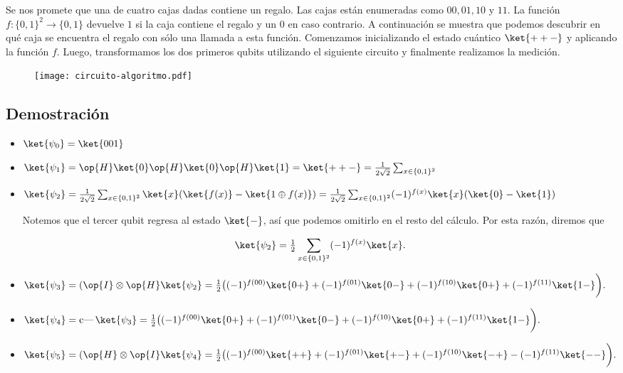 \documentclass[./../main.tex]{subfiles}
\begin{document}

Se nos promete que una de cuatro cajas dadas contiene un regalo. Las cajas están enumeradas como \(00, 01, 10\) y \(11\). La función \(f \colon \{0,1\}^2 \to \{0,1\}\) devuelve \(1\) si la caja contiene el regalo y un \(0\) en caso contrario.
A continuación se muestra que podemos descubrir en qué caja se encuentra el regalo con sólo una llamada a esta función. Comenzamos inicializando el estado cuántico \(\ket{++-}\) y aplicando la función \(f\). Luego, transformamos los dos primeros qubits utilizando el siguiente circuito y finalmente realizamos la medición.

\begin{figure}[htb]
	\centering
	\texttt{[image: circuito-algoritmo.pdf]}
\end{figure}

\subsection*{Demostración}

\begin{itemize}
	\item \(\ket{\psi_{0}} = \ket{001}\)
	\item \(\ket{\psi_{1}} = \op{H}\ket{0}\op{H}\ket{0}\op{H}\ket{1} = \ket{++-} = \tfrac{1}{2\sqrt{2}}\sum_{x\in \{0,1\}^{2}}\)
	\item \(\ket{\psi_{2}} = \tfrac{1}{2\sqrt{2}}\sum_{x\in \{0,1\}^{2}}\ket{x}(\ket{f(x)} -\ket{1 \oplus f(x)}) = \tfrac{1}{2\sqrt{2}}\sum_{x\in \{0,1\}^{2}}(-1)^{f(x)}\ket{x}(\ket{0} - \ket{1})\)

	      Notemos que el tercer qubit regresa al estado \(\ket{-}\), así que podemos omitirlo en el resto del cálculo. Por esta razón, diremos que

	      \begin{equation*}
		      \ket{\psi_{2}} = \tfrac{1}{2}\sum_{x\in \{0,1\}^{2}}(-1)^{f(x)}\ket{x}.
	      \end{equation*}
	\item \(\ket{\psi_{3}} = (\tensprod{\op{I}}{\op{H}}\ket{\psi_{2}} = \tfrac{1}{2}\bigl((-1)^{f(00)}\ket{0+} + (-1)^{f(01)}\ket{0-} + (-1)^{f(10)}\ket{0+} + (-1)^{f(11)}\ket{1-}\biggr).\)
	\item \(\ket{\psi_{4}} = \cnot\ket{\psi_{3}} = \tfrac{1}{2}\bigl((-1)^{f(00)}\ket{0+} + (-1)^{f(01)}\ket{0-} + (-1)^{f(10)}\ket{0+} + (-1)^{f(11)}\ket{1-}\biggr).\)
	\item \(\ket{\psi_{5}} = (\tensprod{\op{H}}{\op{I}}\ket{\psi_{4}} = \tfrac{1}{2}\bigl((-1)^{f(00)}\ket{++} + (-1)^{f(01)}\ket{+-} + (-1)^{f(10)}\ket{-+} - (-1)^{f(11)}\ket{--}\biggr).\)
\end{itemize}
\end{document}

